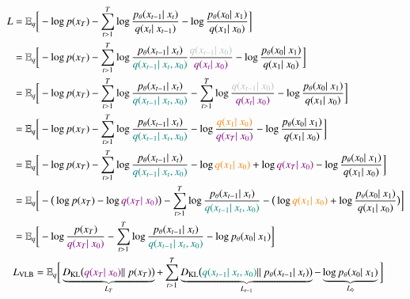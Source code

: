     \begin{equation}\label{eqn:ELBO2}
    \begin{split}
    L & = \mathbb{E}_{q}\bigg[-\log p(x_{T}) - \sum_{t>1}^{T} \log \frac{p_{\theta}(x_{t-1}|~x_{t})}{q(x_{t}|~x_{t-1})}-\log\frac{p_{\theta}(x_{0}|~x_{1})}{q(x_{1}|~x_{0})}\bigg] \\
    & = \mathbb{E}_{q}\bigg[-\log p(x_{T}) - \sum_{t>1}^{T} \log \frac{p_{\theta}(x_{t-1}|~x_{t})}{\textcolor{teal}{q(x_{t-1}|~x_{t}, x_{0})}}\frac{\textcolor{lightgray}{q(x_{t-1}|~x_{0})}}{\textcolor{violet}{q(x_{t}|~x_{0})}}-\log\frac{p_{\theta}(x_{0}|~x_{1})}{q(x_{1}|~x_{0})}\bigg] \\
    & = \mathbb{E}_{q}\bigg[-\log p(x_{T}) - \sum_{t>1}^{T} \log \frac{p_{\theta}(x_{t-1}|~x_{t})}{\textcolor{teal}{q(x_{t-1}|~x_{t}, x_{0})}} -\sum_{t>1}^{T}\log \frac{\textcolor{lightgray}{q(x_{t-1}|~x_{0})}}{\textcolor{violet}{q(x_{t}|~x_{0})}}-\log\frac{p_{\theta}(x_{0}|~x_{1})}{q(x_{1}|~x_{0})}\bigg] \\
    & = \mathbb{E}_{q}\bigg[-\log p(x_{T}) - \sum_{t>1}^{T} \log \frac{p_{\theta}(x_{t-1}|~x_{t})}{\textcolor{teal}{q(x_{t-1}|~x_{t}, x_{0})}}- \log\frac{\textcolor{orange}{q(x_{1}|~x_{0})}}{\textcolor{violet}{q(x_{T}|~x_{0})}} -\log\frac{p_{\theta}(x_{0}|~x_{1})}{q(x_{1}|~x_{0})}\bigg] \\
    & = \mathbb{E}_{q}\bigg[-\log p(x_{T}) - \sum_{t>1}^{T} \log \frac{p_{\theta}(x_{t-1}|~x_{t})}{\textcolor{teal}{q(x_{t-1}|~x_{t}, x_{0})}}- \log\textcolor{orange}{q(x_{1}|~x_{0})} + \log \textcolor{violet}{q(x_{T}|~x_{0})} -\log\frac{p_{\theta}(x_{0}|~x_{1})}{q(x_{1}|~x_{0})}\bigg] \\
    & = \mathbb{E}_{q}\bigg[-\big(\log p(x_{T}) - \log \textcolor{violet}{q(x_{T}|~x_{0})}\big) - \sum_{t>1}^{T} \log \frac{p_{\theta}(x_{t-1}|~x_{t})}{\textcolor{teal}{q(x_{t-1}|~x_{t}, x_{0})}} - \big( \log\textcolor{orange}{q(x_{1}|~x_{0})}  +\log\frac{p_{\theta}(x_{0}|~x_{1})}{q(x_{1}|~x_{0})}\big)\bigg]  \\ 
    & = \mathbb{E}_{q}\bigg[-\log \frac{p(x_{T})}{\textcolor{violet}{q(x_{T}|~x_{0})}} - \sum_{t>1}^{T} \log \frac{p_{\theta}(x_{t-1}|~x_{t})}{\textcolor{teal}{q(x_{t-1}|~x_{t}, x_{0})}} -  \log p_{\theta}(x_{0}|~x_{1})\bigg]  \\
    & L_{\text{\scriptsize{\text{VLB}}}}= \mathbb{E}_{q}\bigg[\underbrace{D_{\text{\scriptsize{KL}}}\big(\textcolor{violet}{q(x_{T}|~x_{0})} ||~p(x_{T}) \big)}_{L_{T}} + \sum_{t>1}^{T} \underbrace{D_{\text{\scriptsize{KL}}}\big( \textcolor{teal}{q(x_{t-1}|~x_{t}, x_{0})}||~p_{\theta}(x_{t-1}|~x_{t}) \big)}_{L_{t-1}} -  \underbrace{\log p_{\theta}(x_{0}|~x_{1})}_{L_{0}} \bigg]
    \end{split}
    \end{equation}
    
